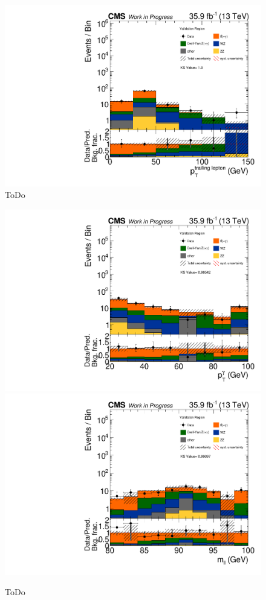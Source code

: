 \begin{figure}[htb]
 \includegraphics[width=\pairwidth]{figures/plots_VR/VR_LL_pt2_log}
 \caption{ToDo}
 \label{fig:VR1}
\end{figure}


\begin{figure}[htb]
 \centering
 \includegraphics[width=\pairwidth]{figures/plots_VR/VR_LL_pt_g1_log}
 \includegraphics[width=\pairwidth]{figures/plots_VR/VR_LL_m_ll_log}
 \caption{ToDo}
 \label{fig:VR2}
\end{figure}


